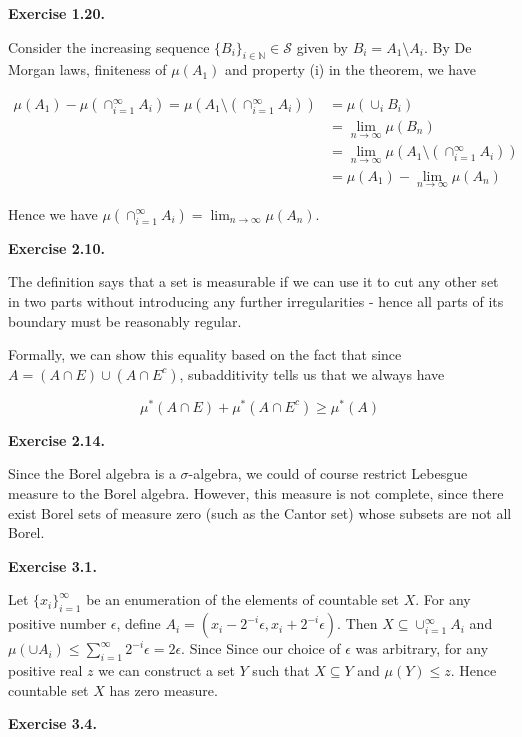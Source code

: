 \documentclass[12pt]{article}
\begin{document}
\textbf{Exercise 1.20.}

Consider the increasing sequence $\{B_{i}\}_{i \in \mathbb{N}}  \in \mathcal{S}$ given by $B_{i} = A_{1} \setminus A_{i}$.  By De Morgan laws, finiteness of $\mu(A_1)$ and property (i) in the theorem, we have

\begin{align*}
\mu(A_1) - \mu(\cap_{i=1}^\infty A_i) = \mu(A_1 \setminus (\cap_{i=1}^\infty A_i))  & = \mu(\cup_{i} B_{i}) \\ & = \lim_{n\rightarrow \infty} \mu(B_n) \\ & =\lim_{n\rightarrow \infty} \mu(A_1 \setminus (\cap_{i=1}^\infty A_i)) \\ & = \mu(A_1) - \lim_{n\rightarrow \infty} \mu(A_n)
\end{align*}

Hence we have $\mu(\cap_{i=1}^\infty A_i) =  \lim_{n\rightarrow \infty} \mu(A_n) $.

\textbf{Exercise 2.10.}

The definition says that a set is measurable if we can use it to cut any other set in two parts without introducing any further irregularities - hence all parts of its boundary must be reasonably regular.

Formally, we can show this equality based on the fact that since $ A = (A \cap E) \cup (A \cap E^{c})$, subadditivity tells us that we always have 

$$\mu^{*} (A \cap E) + \mu^{*} (A \cap E^{c}) \geq \mu^{*} (A) $$ 

\textbf{Exercise 2.14.}

Since the Borel algebra is a $\sigma$-algebra, we could of course restrict Lebesgue measure to the Borel algebra. However, this measure is not complete, since there exist Borel sets of measure zero (such as the Cantor set) whose subsets are not all Borel.

\textbf{Exercise 3.1.}

Let $\{x_{i}\}_{i=1}^{\infty}$ be an enumeration of the elements of countable set $X$. For any positive number $\epsilon$, define $A_{i} = (x_{i} - 2^{-i}\epsilon, x_{i} + 2^{-i}\epsilon)$. Then $X \subseteq \cup_{i=1}^{\infty} A_{i}$ and $\mu(\cup A_i) \leq \sum_{i=1}^{\infty} 2^{-i}\epsilon = 2\epsilon$. Since Since our choice of $\epsilon$ was arbitrary, for any positive real $z$
we can construct a set $Y$ such that $X \subseteq Y$ and $\mu(Y) \leq z$. Hence countable set $X$ has zero measure. 

\textbf{Exercise 3.4.}
\end{document}
